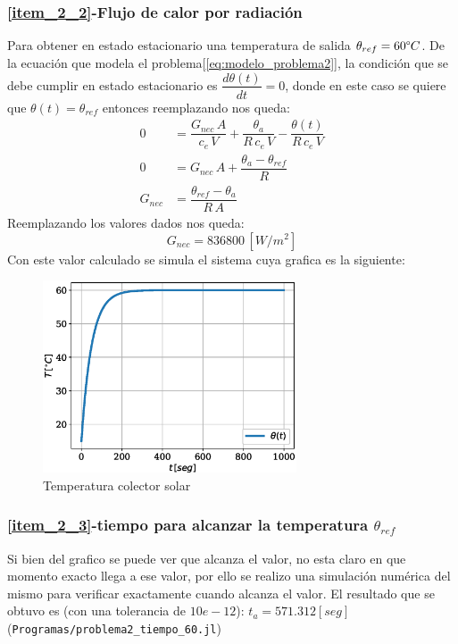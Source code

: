 \subsubsection{\ref{item_2_2}-Flujo de calor por radiación}
Para obtener en estado estacionario una temperatura de salida $\theta_{ref}=60\degree C$. De la ecuación que
modela el problema[\ref{eq:modelo_problema2}], la condición que se debe cumplir en estado estacionario
es $\dfrac{d\theta(t)}{dt} = 0$, donde en este caso se quiere que $\theta(t)=\theta_{ref}$ entonces
reemplazando nos queda:
\begin{align}
   0 &= \dfrac{G_{nec}\,A}{c_{e}\,V} + \dfrac{\theta_{a}}{R\,c_{e}\,V} - \dfrac{\theta(t)}{R\,c_{e}\,V}\\
   0 &= G_{nec} \, A + \dfrac{\theta_{a}-\theta_{ref}}{R}\\
   G_{nec} &= \dfrac{\theta_{ref}-\theta_{a}}{R\,A}\label{eq:flujo_necesario}
\end{align}
Reemplazando los valores dados nos queda:
\begin{equation}
   G_{nec} = 836800 \,[W/m^{2}]
\end{equation}
Con este valor calculado se simula el sistema cuya grafica es la siguiente:

\begin{figure}[H]
   \centering
   \includegraphics[width=0.67\textwidth]{Images/temperatura_colector.eps}
   \caption{Temperatura colector solar}\label{fig:colector_temperatura}
\end{figure}


\subsubsection{\ref{item_2_3}-tiempo para alcanzar la temperatura $\theta_{ref}$}
Si bien del grafico se puede ver que alcanza el valor, no esta claro en que momento exacto llega a ese valor,
por ello se realizo una simulación numérica del mismo para verificar exactamente cuando
alcanza el valor. El resultado que se obtuvo es (con una tolerancia de $10e-12$): $t_a =571.312[seg]$
(\verb|Programas/problema2_tiempo_60.jl|)

